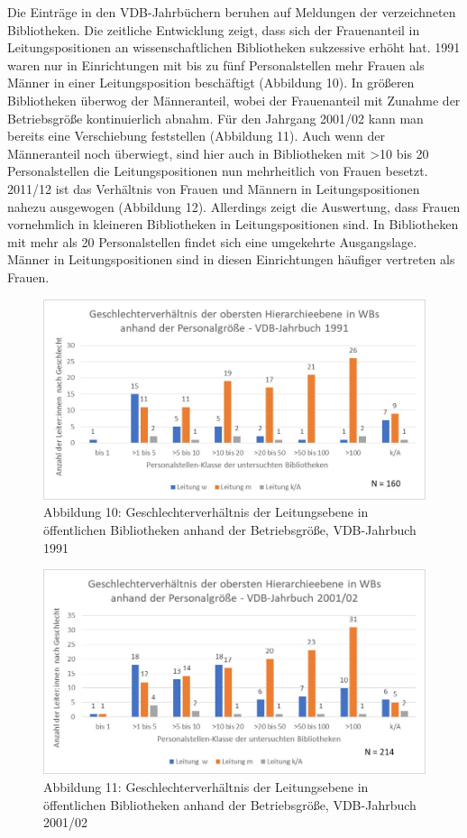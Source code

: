 \documentclass[a4paper,
fontsize=11pt,
oneside,
numbers=noperiodatend,
parskip=half-,
bibliography=totoc,
final
]{scrartcl}
\begin{document}
Die Einträge in den VDB-Jahrbüchern beruhen auf Meldungen der
verzeichneten Bibliotheken. Die zeitliche Entwicklung zeigt, dass sich
der Frauenanteil in Leitungspositionen an wissenschaftlichen
Bibliotheken sukzessive erhöht hat. 1991 waren nur in Einrichtungen mit
bis zu fünf Personalstellen mehr Frauen als Männer in einer
Leitungsposition beschäftigt (Abbildung 10). In größeren Bibliotheken
überwog der Männeranteil, wobei der Frauenanteil mit Zunahme der
Betriebsgröße kontinuierlich abnahm. Für den Jahrgang 2001/02 kann man
bereits eine Verschiebung feststellen (Abbildung 11). Auch wenn der
Männeranteil noch überwiegt, sind hier auch in Bibliotheken mit
\textgreater10 bis 20 Personalstellen die Leitungspositionen nun
mehrheitlich von Frauen besetzt. 2011/12 ist das Verhältnis von Frauen
und Männern in Leitungspositionen nahezu ausgewogen (Abbildung 12).
Allerdings zeigt die Auswertung, dass Frauen vornehmlich in kleineren
Bibliotheken in Leitungspositionen sind. In Bibliotheken mit mehr als 20
Personalstellen findet sich eine umgekehrte Ausgangslage. Männer in
Leitungspositionen sind in diesen Einrichtungen häufiger vertreten als
Frauen.

\begin{figure}
\centering
\includegraphics{img/Abb_10_VDB-1991.jpg}
\caption{Abbildung 10: Geschlechterverhältnis der Leitungsebene in
öffentlichen Bibliotheken anhand der Betriebsgröße, VDB-Jahrbuch 1991}
\end{figure}

\begin{figure}
\centering
\includegraphics{img/Abb_11_VDB-2001.jpg}
\caption{Abbildung 11: Geschlechterverhältnis der Leitungsebene in
öffentlichen Bibliotheken anhand der Betriebsgröße, VDB-Jahrbuch
2001/02}
\end{figure}
\end{document}
